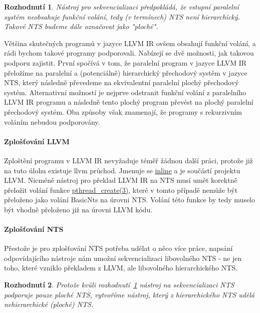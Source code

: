 \documentclass[10pt,a4paper,notitlepage]{report}
\newtheorem{decision}{Rozhodnutí}
\begin{document}
\begin{decision}\label{decision:sequentialize-flat-llvm}
Nástroj pro sekvencializaci předpokládá, že vstupní paralelní systém neobsahuje funkční volání, tedy (v termínech) NTS není hierarchický. Takové NTS budeme dále označovat jako "ploché".
\end{decision}

Většina skutečných programů v jazyce LLVM IR ovšem obsahují funkční volání, a rádi bychom takové programy podporovali. Nabízejí se dvě možnosti, jak takovou podporu zajistit. První spočívá v tom, že paralelní program v jazyce LLVM IR přeložíme na paralelní a (potenciálně) hierarchický přechodový systém v jazyce NTS, který následně převedeme na ekvivalentní paralelní plochý přechodový systém. Alternativní možností je nejprve odstranit funkční volání z paralelního LLVM IR programu a následně tento plochý program převést na plochý paralelní přechodový systém. Oba způsoby však znamenají, že programy s rekurzivním voláním nebudou podporovány.

\paragraph{Zplošťování LLVM}
Zploštění programu v LLVM IR nevyžaduje téměř žádnou další práci, protože již na tuto úlohu existuje llvm průchod. Jmenuje se
\href{http://llvm.org/docs/Passes.html#inline-function-integration-inlining}
{inline} a je součástí projektu LLVM. Nicméně nástroj pro překlad LLVM IR na NTS musí umět korektně přeložit volání funkce
\href{http://man7.org/linux/man-pages/man3/pthread\_create.3.html}
{pthread\_create(3)}, které v tomto případě nemůže být přeloženo jako volání BasicNts na úrovni NTS. Volání této funkce by tedy muselo být vhodně přeloženo již na úrovni LLVM kódu.

\paragraph{Zplošťování NTS}
Přestože je pro zplošťování NTS potřeba udělat o něco více práce, napsání odpovídajícího nástroje nám umožní sekvencializaci libovolného NTS - ne jen toho, které vzniklo překladem z LLVM, ale libovolného hierarchického NTS.

\begin{decision}\label{decision:do-nts-flattening}
Protože kvůli rozhodnutí~\ref{decision:sequentialize-flat-llvm} nástroj na sekvencializaci NTS podporuje pouze ploché NTS, vytvoříme nástroj, který z hierarchického NTS udělá nehierarchické (ploché) NTS.
\end{decision}
\end{document}
